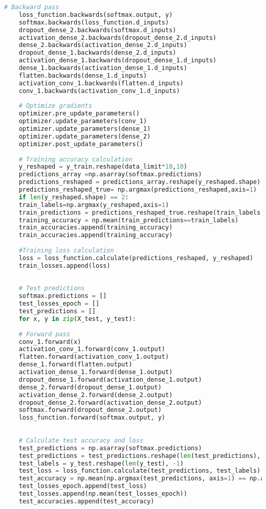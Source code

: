 \begin{lstlisting}[language=Python, caption=Model]
	# Backward pass
	loss_function.backwards(softmax.output, y)
	softmax.backwards(loss_function.d_inputs)
	dropout_dense_2.backwards(softmax.d_inputs)
	activation_dense_2.backwards(dropout_dense_2.d_inputs)
	dense_2.backwards(activation_dense_2.d_inputs)
	dropout_dense_1.backwards(dense_2.d_inputs)
	activation_dense_1.backwards(dropout_dense_1.d_inputs)
	dense_1.backwards(activation_dense_1.d_inputs)
	flatten.backwards(dense_1.d_inputs)
	activation_conv_1.backwards(flatten.d_inputs)
	conv_1.backwards(activation_conv_1.d_inputs)
	
	# Optimize gradients
	optimizer.pre_update_parameters()
	optimizer.update_parameters(conv_1)
	optimizer.update_parameters(dense_1)
	optimizer.update_parameters(dense_2)
	optimizer.post_update_parameters()
	
	# Training accuracy calculation
	y_reshaped = y_train.reshape(data_limit*10,10)
	predictions_array =np.asarray(softmax.predictions)
	predictions_reshaped = predictions_array.reshape(y_reshaped.shape)
	predictions_reshaped_true= np.argmax(predictions_reshaped,axis=1)
	if len(y_reshaped.shape) == 2:
	train_labels=np.argmax(y_reshaped,axis=1)  
	train_predictions = predictions_reshaped_true.reshape(train_labels.shape)
	training_accuracy = np.mean(train_predictions==train_labels)
	train_accuracies.append(training_accuracy)
	train_accuracies.append(training_accuracy)
	
	#Training loss calculation
	loss = loss_function.calculate(predictions_reshaped, y_reshaped)
	train_losses.append(loss)
	
	
	# Test predictions
	softmax.predictions = []
	test_losses_epoch = []
	test_predictions = []
	for x, y in zip(X_test, y_test):
	
	# Forward pass
	conv_1.forward(x)
	activation_conv_1.forward(conv_1.output)
	flatten.forward(activation_conv_1.output)
	dense_1.forward(flatten.output)
	activation_dense_1.forward(dense_1.output)
	dropout_dense_1.forward(activation_dense_1.output)
	dense_2.forward(dropout_dense_1.output)
	activation_dense_2.forward(dense_2.output)
	dropout_dense_2.forward(activation_dense_2.output)
	softmax.forward(dropout_dense_2.output)
	loss_function.forward(softmax.output, y)
	
	
	# Calculate test accuracy and loss
	test_predictions = np.asarray(softmax.predictions)
	test_predictions = test_predictions.reshape(len(test_predictions), -1)
	test_labels = y_test.reshape(len(y_test), -1)
	test_loss = loss_function.calculate(test_predictions, test_labels)
	test_accuracy = np.mean(np.argmax(test_predictions, axis=1) == np.argmax(test_labels, axis=1))
	test_losses_epoch.append(test_loss)
	test_losses.append(np.mean(test_losses_epoch))
	test_accuracies.append(test_accuracy)
	

\end{lstlisting}

